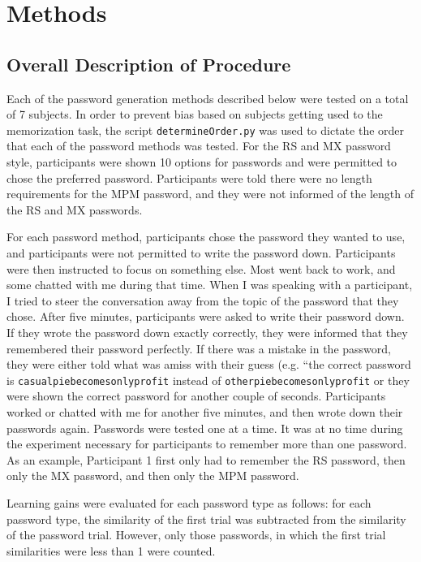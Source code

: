 \documentclass{article}
\begin{document}
\section*{Methods}
\subsection*{Overall Description of Procedure}
Each of the password generation methods described below were tested on a total of 7 subjects. In order to prevent bias based on subjects getting used to the memorization task, the script \texttt{determineOrder.py} was used to dictate the order that each of the password methods was tested. For the RS and MX password style, participants were shown 10 options for passwords and were permitted to chose the preferred password. Participants were told there were no length requirements for the MPM password, and they were not informed of the length of the RS and MX passwords.

For each password method, participants chose the password they wanted to use, and participants were not permitted to write the password down. Participants were then instructed to focus on something else. Most went back to work, and some chatted with me during that time. When I was speaking with a participant, I tried to steer the conversation away from the topic of the password that they chose. After five minutes, participants were asked to write their password down. If they wrote the password down exactly correctly, they were informed that they remembered their password perfectly. If there was a mistake in the password, they were either told what was amiss with their guess (e.g. ``the correct password is \texttt{casualpiebecomesonlyprofit} instead of \texttt{otherpiebecomesonlyprofit} or they were shown the correct password for another couple of seconds. Participants worked or chatted with me for another five minutes, and then wrote down their passwords again. Passwords were tested one at a time. It was at no time during the experiment necessary for participants to remember more than one password. As an example, Participant 1 first only had to remember the RS password, then only the MX password, and then only the MPM password.

Learning gains were evaluated for each password type as follows: for each password type, the similarity of the first trial was subtracted from the similarity of the password trial. However, only those passwords, in which the first trial similarities were less than 1 were counted. 
\end{document}
